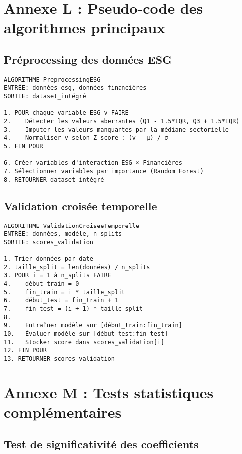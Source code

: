 \begin{table}[h]
\begin{table}[h]
\begin{table}[h]
\begin{table}[h]
\begin{table}[h]
\begin{table}[h]
\begin{table}[h]
\section{Annexe L : Pseudo-code des algorithmes principaux}

\subsection{Préprocessing des données ESG}

\begin{verbatim}
ALGORITHME PreprocessingESG
ENTRÉE: données_esg, données_financières
SORTIE: dataset_intégré

1. POUR chaque variable ESG v FAIRE
2.    Détecter les valeurs aberrantes (Q1 - 1.5*IQR, Q3 + 1.5*IQR)
3.    Imputer les valeurs manquantes par la médiane sectorielle
4.    Normaliser v selon Z-score : (v - μ) / σ
5. FIN POUR

6. Créer variables d'interaction ESG × Financières
7. Sélectionner variables par importance (Random Forest)
8. RETOURNER dataset_intégré
\end{verbatim}

\subsection{Validation croisée temporelle}

\begin{verbatim}
ALGORITHME ValidationCroiseeTemporelle
ENTRÉE: données, modèle, n_splits
SORTIE: scores_validation

1. Trier données par date
2. taille_split = len(données) / n_splits
3. POUR i = 1 à n_splits FAIRE
4.    début_train = 0
5.    fin_train = i * taille_split
6.    début_test = fin_train + 1
7.    fin_test = (i + 1) * taille_split
8.    
9.    Entraîner modèle sur [début_train:fin_train]
10.   Évaluer modèle sur [début_test:fin_test]
11.   Stocker score dans scores_validation[i]
12. FIN POUR
13. RETOURNER scores_validation
\end{verbatim}

\section{Annexe M : Tests statistiques complémentaires}

\subsection{Test de significativité des coefficients}


\end{table}
\end{table}
\end{table}
\end{table}
\end{table}
\end{table}
\end{table}
